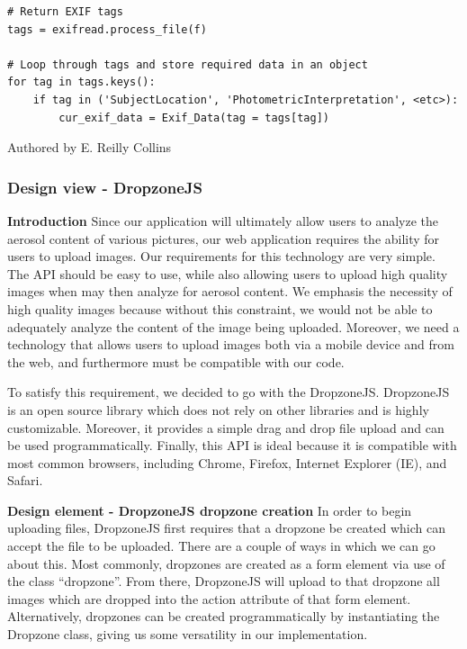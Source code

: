 \documentclass[onecolumn, draftclsnofoot,10pt, compsoc]{IEEEtran}
\begin{document}
\begin{flushleft}
\begin{lstlisting}
# Return EXIF tags
tags = exifread.process_file(f)

# Loop through tags and store required data in an object
for tag in tags.keys():
    if tag in ('SubjectLocation', 'PhotometricInterpretation', <etc>):
        cur_exif_data = Exif_Data(tag = tags[tag])
\end{lstlisting}
\smallskip
\footnotesize Authored by E. Reilly Collins
\normalsize

\bigskip

\subsubsection{Design view - DropzoneJS}
\textbf{Introduction} Since our application will ultimately allow users to analyze the aerosol content of various pictures, our web application requires the ability for users to upload images.
Our requirements for this technology are very simple. The API should be easy to use, while also allowing users to upload high quality images when may then analyze for aerosol content. We emphasis the necessity of high quality images because without this constraint, we would not be able to adequately analyze the content of the image being uploaded. Moreover, we need a technology that allows users to upload images both via a mobile device and from the web, and furthermore must be compatible with our code.

\medskip

To satisfy this requirement, we decided to go with the DropzoneJS. DropzoneJS is an open source library which does not rely on other libraries and is highly customizable. Moreover, it provides a simple drag and drop file upload and can be used programmatically. Finally, this API is ideal because it is compatible with most common browsers, including Chrome, Firefox, Internet Explorer (IE), and Safari. \cite{14}

\medskip

\textbf{Design element - DropzoneJS dropzone creation}
In order to begin uploading files, DropzoneJS first requires that a dropzone be created which can accept the file to be uploaded. There are a couple of ways in which we can go about this. Most commonly, dropzones are created as a form element via use of the class “dropzone”. From there, DropzoneJS will upload to that dropzone all images which are dropped into the action attribute of that form element. Alternatively, dropzones can be created programmatically by instantiating the Dropzone class, giving us some versatility in our implementation. \cite{14}


\end{flushleft}
\end{document}
